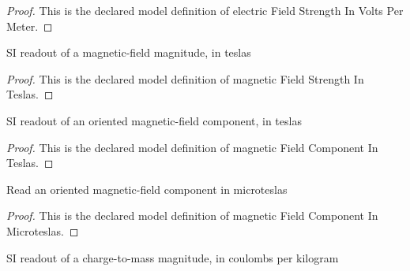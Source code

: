 \begin{proof}
  This is the declared model definition of electric Field Strength In Volts Per Meter.
\end{proof}
\begin{definition}
  \label{def:physics:phyx-mini-0561:phyxminiproblems-problemphyxmini0561-magneticfieldstrengthinteslas}
  SI readout of a magnetic-field magnitude, in teslas
\end{definition}
\begin{proof}
  This is the declared model definition of magnetic Field Strength In Teslas.
\end{proof}
\begin{definition}
  \label{def:physics:phyx-mini-0561:phyxminiproblems-problemphyxmini0561-magneticfieldcomponentinteslas}
  SI readout of an oriented magnetic-field component, in teslas
\end{definition}
\begin{proof}
  This is the declared model definition of magnetic Field Component In Teslas.
\end{proof}
\begin{definition}
  \label{def:physics:phyx-mini-0561:phyxminiproblems-problemphyxmini0561-magneticfieldcomponentinmicroteslas}
  Read an oriented magnetic-field component in microteslas
\end{definition}
\begin{proof}
  This is the declared model definition of magnetic Field Component In Microteslas.
\end{proof}
\begin{definition}
  \label{def:physics:phyx-mini-0561:phyxminiproblems-problemphyxmini0561-chargetomassincoulombsperkilogram}
  SI readout of a charge-to-mass magnitude, in coulombs per kilogram
\end{definition}
